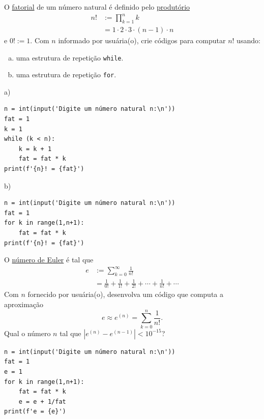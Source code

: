 \begin{exer}
  O \href{https://pt.wikipedia.org/wiki/Fatorial}{fatorial} de um número natural é definido pelo \href{https://pt.wikipedia.org/wiki/Produt\%C3\%B3rio}{produtório}
  \begin{align}
    n! &:= \prod_{k=1}^{n}k\\
       &= 1\cdot 2\cdot 3 \cdot (n-1)\cdot n
  \end{align}
  e $0! := 1$. Com $n$ informado por usuária(o), crie códigos para computar $n!$ usando:
  \begin{enumerate}[a)]
  \item uma estrutura de repetição \lstinline+while+.
  \item uma estrutura de repetição \lstinline+for+.
  \end{enumerate}
\end{exer}
\begin{resp}
  a)

\begin{lstlisting}
n = int(input('Digite um número natural n:\n'))
fat = 1
k = 1
while (k < n):
    k = k + 1
    fat = fat * k
print(f'{n}! = {fat}')
\end{lstlisting}

b)

\begin{lstlisting}
n = int(input('Digite um número natural n:\n'))
fat = 1
for k in range(1,n+1):
    fat = fat * k
print(f'{n}! = {fat}')
\end{lstlisting}

\end{resp}

\begin{exer}
  O \href{https://pt.wikipedia.org/wiki/E_(constante_matem\%C3\%A1tica)}{número de Euler}{\euler} é tal que
  \begin{align}
    e &:= \sum_{k=0}^\infty \frac{1}{n!}\\
      &= \frac{1}{0!} + \frac{1}{1!} + \frac{1}{2!} + \cdots + \frac{1}{n!} + \cdots
  \end{align}
  Com $n$ fornecido por usuária(o), desenvolva um código que computa a aproximação
  \begin{equation}
    e \approx e^{(n)} = \sum_{k=0}^n \frac{1}{n!}.
  \end{equation}
  Qual o número $n$ tal que $\left|e^{(n)} - e^{(n-1)}\right|<10^{-15}$?
\end{exer}
\begin{resp}

\begin{lstlisting}
n = int(input('Digite um número natural n:\n'))
fat = 1
e = 1
for k in range(1,n+1):
    fat = fat * k
    e = e + 1/fat
print(f'e = {e}')
\end{lstlisting}

\end{resp}

